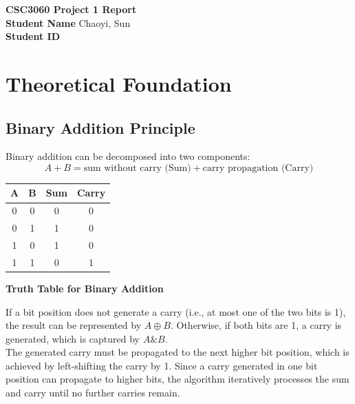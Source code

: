 \documentclass[11pt]{article}
\begin{document}
\begin{center}
    \centering
    {\Huge \textbf{CSC3060 Project 1 Report}} \\[0.5cm]
    
    \textbf{Student Name} \quad Chaoyi, Sun \\[0.1cm]
    \textbf{Student ID}  \\[1cm]
\end{center}

\section{Theoretical Foundation}

\subsection{Binary Addition Principle}
Binary addition can be decomposed into two components:
\[
    A + B = \text{sum without carry (Sum)} + \text{carry propagation (Carry)}
\]

\begin{center}
\begin{tabular}{cccc}
\toprule
\textbf{A} & \textbf{B} & \textbf{Sum} & \textbf{Carry} \\
\midrule
0 & 0 & 0 & 0 \\
0 & 1 & 1 & 0 \\
1 & 0 & 1 & 0 \\
1 & 1 & 0 & 1 \\
\bottomrule
\end{tabular}
\par\vspace{5pt}
\textbf{Truth Table for Binary Addition}
\end{center}
If a bit position does not generate a carry (i.e., at most one of the two bits is 1), the result can be represented by $A \oplus B$. Otherwise, if both bits are 1, a carry is generated, which is captured by $A \& B$.
\vspace{3pt}\\
The generated carry must be propagated to the next higher bit position, which is achieved by left-shifting the carry by 1. Since a carry generated in one bit position can propagate to higher bits, the algorithm iteratively processes the sum and carry until no further carries remain.
\vspace{8pt}\\
\begin{algorithm}[H]
\caption{Addition via Bitwise Operations}

\end{algorithm}
\end{document}
